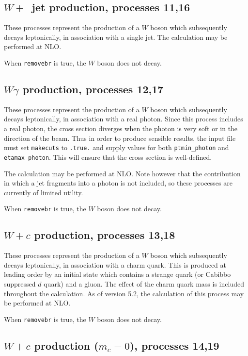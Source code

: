 \documentclass[12pt]{article}
\begin{document}
\subsection{$W+$~jet production, processes 11,16}
\label{subsec:w1jet}

These processes represent the production of a $W$ boson which subsequently
decays leptonically, in association with a single jet.
The calculation may be performed at NLO.

When {\tt removebr} is true, the $W$ boson does not decay.

\subsection{$W\gamma$ production, processes 12,17}
\label{subsec:wgamma}

These processes represent the production of a $W$ boson which subsequently
decays leptonically, in association with a real photon.
Since this process includes a real photon, the cross section diverges
when the photon is very soft or in the direction of the beam.
Thus in order to produce sensible results, the input file must set
{\tt makecuts} to {\tt .true.} and supply values for both
{\tt ptmin\_photon} and {\tt etamax\_photon}. This will ensure that
the cross section is well-defined.

The calculation may be performed at NLO. Note however that the contribution
in which a jet fragments into a photon is not included, so these processes 
are currently of limited utility.

When {\tt removebr} is true, the $W$ boson does not decay.

\subsection{$W+c$ production, processes 13,18}
\label{subsec:wc}

These processes represent the production of a $W$ boson which
subsequently decays leptonically, in association with a charm
quark. This is produced at leading order by an initial state which
contains a strange quark (or Cabibbo suppressed $d$ quark) and a
gluon.  The effect of the charm quark mass is included throughout the
calculation.  As of version 5.2, the calculation of this process may
be performed at NLO.

When {\tt removebr} is true, the $W$ boson does not decay.

\subsection{$W+c$ production ($m_c=0$), processes 14,19}
\label{subsec:wcmassless}
\end{document}
